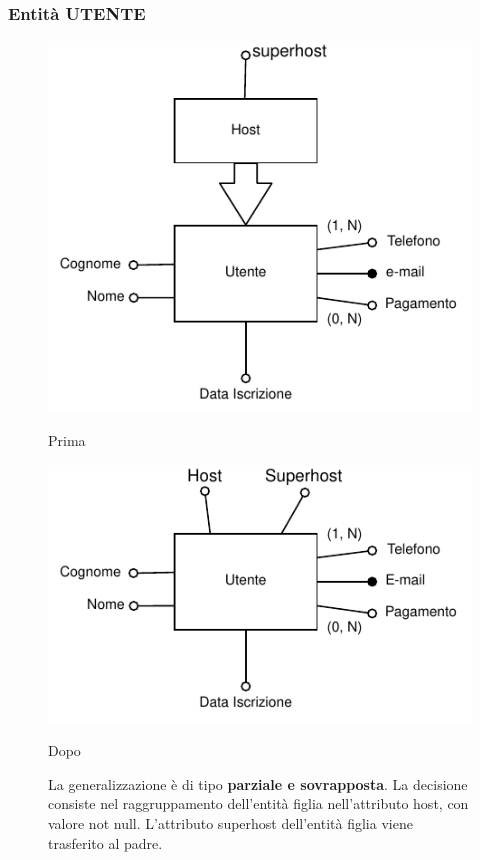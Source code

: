 \subsubsection{Entità UTENTE}
\begin{figure}[H]
      \centering
      \begin{minipage}[b]{0.45\textwidth}
            \includegraphics[width=\textwidth]{resources/pdf/page11.pdf}
            \caption{Prima}
      \end{minipage}
      \hfill
      \begin{minipage}[b]{0.45\textwidth}
            \includegraphics[width=\textwidth]{resources/pdf/page12.pdf}
            \caption{Dopo}
      \end{minipage}
      \caption*{La generalizzazione è di tipo \textbf{parziale e sovrapposta}. La decisione consiste nel raggruppamento dell'entità figlia nell'attributo host, con valore not null. L'attributo superhost dell'entità figlia viene trasferito al padre.}
\end{figure}


